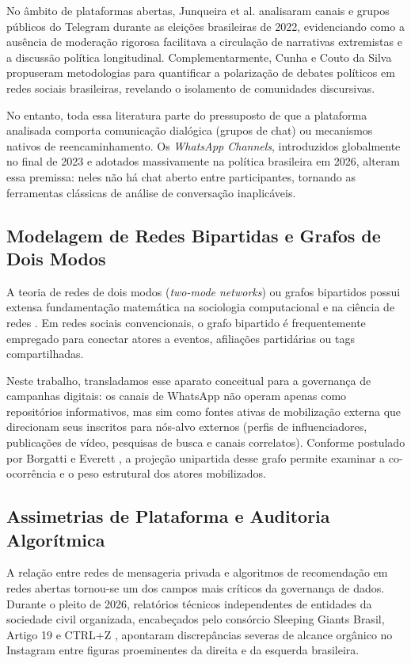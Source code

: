 \documentclass[12pt]{article}
\begin{document}
No âmbito de plataformas abertas, Junqueira et al. \cite{junqueira2025telegram} analisaram canais e grupos públicos do Telegram durante as eleições brasileiras de 2022, evidenciando como a ausência de moderação rigorosa facilitava a circulação de narrativas extremistas e a discussão política longitudinal. Complementarmente, Cunha e Couto da Silva \cite{cunha2024polarizacao} propuseram metodologias para quantificar a polarização de debates políticos em redes sociais brasileiras, revelando o isolamento de comunidades discursivas.

No entanto, toda essa literatura parte do pressuposto de que a plataforma analisada comporta comunicação dialógica (grupos de chat) ou mecanismos nativos de reencaminhamento. Os \textit{WhatsApp Channels}, introduzidos globalmente no final de 2023 e adotados massivamente na política brasileira em 2026, alteram essa premissa: neles não há chat aberto entre participantes, tornando as ferramentas clássicas de análise de conversação inaplicáveis.

\subsection{Modelagem de Redes Bipartidas e Grafos de Dois Modos}
A teoria de redes de dois modos (\textit{two-mode networks}) ou grafos bipartidos possui extensa fundamentação matemática na sociologia computacional e na ciência de redes \cite{borgatti1997twomode,latapy2008twomode}. Em redes sociais convencionais, o grafo bipartido é frequentemente empregado para conectar atores a eventos, afiliações partidárias ou tags compartilhadas. 

Neste trabalho, transladamos esse aparato conceitual para a governança de campanhas digitais: os canais de WhatsApp não operam apenas como repositórios informativos, mas sim como fontes ativas de mobilização externa que direcionam seus inscritos para nós-alvo externos (perfis de influenciadores, publicações de vídeo, pesquisas de busca e canais correlatos). Conforme postulado por Borgatti e Everett \cite{borgatti1997twomode}, a projeção unipartida desse grafo permite examinar a co-ocorrência e o peso estrutural dos atores mobilizados.

\subsection{Assimetrias de Plataforma e Auditoria Algorítmica}
A relação entre redes de mensageria privada e algoritmos de recomendação em redes abertas tornou-se um dos campos mais críticos da governança de dados. Durante o pleito de 2026, relatórios técnicos independentes de entidades da sociedade civil organizada, encabeçados pelo consórcio Sleeping Giants Brasil, Artigo 19 e CTRL+Z \cite{sleepinggiants2026nikolas}, apontaram discrepâncias severas de alcance orgânico no Instagram entre figuras proeminentes da direita e da esquerda brasileira.
\end{document}
